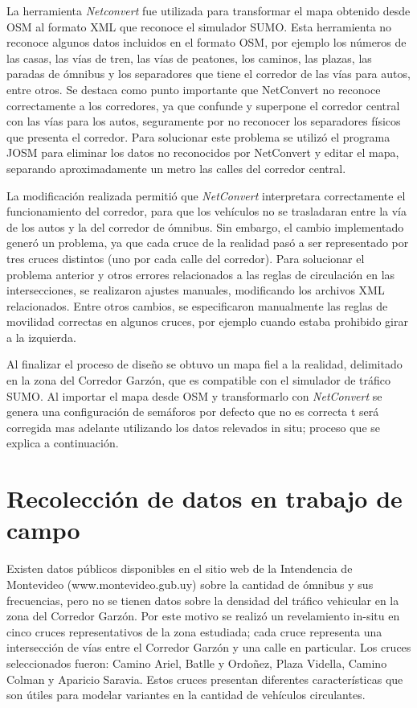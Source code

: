 La herramienta \emph{Netconvert} fue utilizada para transformar el mapa obtenido desde OSM al formato XML que reconoce el simulador SUMO. Esta herramienta no reconoce algunos datos incluidos en el formato OSM, por ejemplo los números de las casas, las vías de tren, las vías de peatones, los caminos, las plazas, las paradas de ómnibus y los separadores que tiene el corredor de las vías para autos, entre otros. Se destaca como punto importante que NetConvert no reconoce correctamente a los corredores, ya que confunde y superpone el corredor central con las vías para los autos, seguramente por no reconocer los separadores físicos que presenta el corredor. Para solucionar este problema se utilizó el programa JOSM para eliminar los datos no reconocidos por NetConvert y editar el mapa, separando aproximadamente un metro las calles del corredor central.

La modificación realizada permitió que \emph{NetConvert} interpretara correctamente el funcionamiento del corredor, para que los vehículos no se trasladaran entre la vía de los autos y la del corredor de ómnibus. Sin embargo, el cambio implementado generó un problema, ya que cada cruce de la realidad pasó a ser representado por tres cruces distintos (uno por cada calle del corredor). Para solucionar el problema anterior y otros errores relacionados a las reglas de circulación en las intersecciones, se realizaron ajustes manuales, modificando los archivos XML relacionados. Entre otros cambios, se especificaron manualmente las reglas de movilidad correctas en algunos cruces, por ejemplo cuando estaba prohibido girar a la izquierda.

Al finalizar el proceso de diseño se obtuvo un mapa fiel a la realidad, delimitado en la zona del Corredor Garzón, que es compatible con el simulador de tráfico SUMO. Al importar el mapa desde OSM y transformarlo con \emph{NetConvert} se genera una configuración de semáforos por defecto que no es correcta t será corregida mas adelante utilizando los datos relevados in situ; proceso que se explica a continuación.


\section{Recolección de datos en trabajo de campo}

Existen datos públicos disponibles en el sitio web de la Intendencia de Montevideo (www.montevideo.gub.uy) sobre la cantidad de ómnibus y sus frecuencias, pero no se tienen datos sobre la densidad del tráfico vehicular en la zona del Corredor Garzón. Por este motivo se realizó un revelamiento in-situ en cinco cruces representativos de la zona estudiada; cada cruce representa una intersección de vías entre el Corredor Garzón y una calle en particular. Los cruces seleccionados fueron: Camino Ariel, Batlle y Ordoñez, Plaza Vidella, Camino Colman y Aparicio Saravia. Estos cruces presentan diferentes características que son útiles para modelar variantes en la cantidad de vehículos circulantes. 

